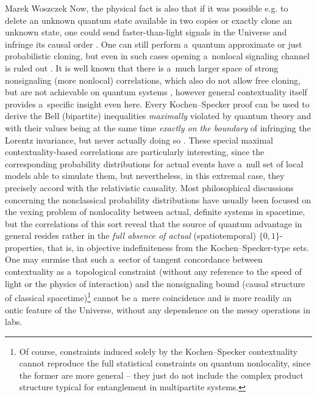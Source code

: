 \begin{artengenv}{Marek Woszczek}
Now, the physical fact is also that if it was possible e.g. to delete an unknown quantum state available in two copies or exactly clone an unknown state, one could send faster-than-light signals in the Universe and infringe its causal order
\parencites[][]{gisin_quantum_1998}[][]{gisin_quantum_1998}. %
 One can still perform a~quantum approximate or just probabilistic cloning, but even in such cases opening a~nonlocal signaling channel is ruled out 
\parencites[][]{pati_probabilistic_2000}[][]{pati_probabilistic_2000}. %
 It is well known that there is a~much larger space of strong nonsignaling (more nonlocal) correlations, which also do not allow free cloning, but are not achievable on quantum systems 
\parencite[][]{masanes_general_2006}, %
 however general contextuality itself provides a~specific insight even here. Every Kochen–Specker proof can be used to derive the Bell (bipartite) inequalities \textit{maximally} violated by quantum theory and with their values being at the same time \textit{exactly on the boundary} of infringing the Lorentz invariance, but never actually doing so 
\parencite[][]{aolita_fully_2012}. %
 These special maximal contextuality-based correlations are particularly interesting, since the corresponding probability distributions for actual events have a~null set of local models able to simulate them, but nevertheless, in this extremal case, they precisely accord with the relativistic causality. Most philosophical discussions concerning the nonclassical probability distributions have usually been focused on the vexing problem of nonlocality between actual, definite systems in spacetime, but the correlations of this sort reveal that the source of quantum advantage in general resides rather in the \textit{full absence of actual} (spatiotemporal) $\{0,1\}$-properties, that is, in objective indefiniteness from the Kochen–Specker-type sets. One may surmise that such a~sector of tangent concordance between contextuality as a~topological constraint (without any reference to the speed of light or the physics of interaction) and the nonsignaling bound (causal structure of classical spacetime)\footnote{Of course, constraints induced solely by the Kochen–Specker contextuality cannot reproduce the full statistical constraints on quantum nonlocality, since the former are more general -- they just do not include the complex product structure typical for entanglement in multipartite systems.} cannot be a~mere coincidence and is more readily an ontic feature of the Universe, without any dependence on the messy operations in labs.


\end{artengenv}
